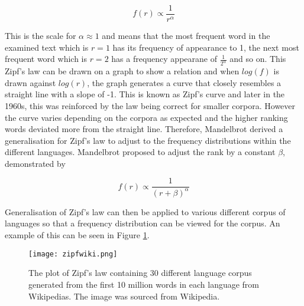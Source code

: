 \begin{equation}\label{eq:zipfs}
f(r) \propto \frac{1}{r^{\alpha}}
\end{equation}

This is the scale for $\alpha \approx 1$ and means that the most frequent word in the examined text which is $r = 1$ has its frequency of appearance to 1, the next most frequent word which is $r = 2$ has a frequency appearane of $\frac{1}{2^{\alpha}}$ and so on. This Zipf's law can be drawn on a graph to show a relation and when $log(f)$ is drawn against $log(r)$, the graph generates a curve that closely resembles a straight line with a slope of -1. This is known as Zipf's curve and later in the 1960s, this was reinforced by the law being correct for smaller corpora\cite{sicilia2002extension}. However the curve varies depending on the corpora as expected and the higher ranking words deviated more from the straight line. Therefore, Mandelbrot derived a generalisation for Zipf's law to adjust to the frequency distributions within the different languages. Mandelbrot proposed to adjust the rank by a constant $\beta$, demonstrated by

\begin{equation}\label{eq:zipfs}
f(r) \propto \frac{1}{(r + \beta)^{\alpha}}
\end{equation}

Generalisation of Zipf's law can then be applied to various different corpus of languages so that a frequency distribution can be viewed for the corpus. An example of this can be seen in Figure \ref{fig:zipfwiki}.

\begin{figure}[!htb]
	\centering
	\texttt{[image: zipfwiki.png]}
	\caption{The plot of Zipf's law containing 30 different language corpus generated from the first 10 million words in each language from Wikipedias. The image was sourced from Wikipedia\cite{zipffigure}. }
	\label{fig:zipfwiki}
\end{figure}

